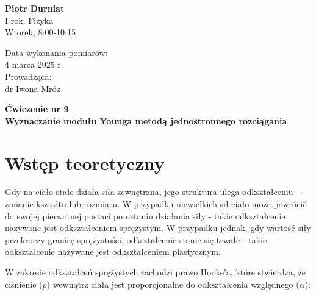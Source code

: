 \documentclass[a4paper,12pt]{article}
\begin{document}
\noindent
\begin{minipage}{0.5\textwidth}
    \raggedright
    \textbf{Piotr Durniat} \\
    I rok, Fizyka \\
    Wtorek, 8:00-10:15 \\
    \vspace{0.5cm}
    \vspace{0.5cm}
\end{minipage}%
\begin{minipage}{0.5\textwidth}
    \raggedleft
    Data wykonania pomiarów: \\
    4 marca 2025 r. \\
    \vspace{0.5cm} %
    Prowadząca: \\
    dr Iwona Mróz
\end{minipage}

\vspace{2cm} %
\begin{center}
    \LARGE \textbf{Ćwiczenie nr 9} \\[0.5cm]
    \Large \textbf{Wyznaczanie modułu Younga metodą jednostronnego rozciągania}
\end{center}

\vspace{1cm} %
\noindent


\section{Wstęp teoretyczny}


Gdy na ciało stałe działa siła zewnętrzna, jego struktura ulega odkształceniu - zmianie kształtu lub rozmiaru. W przypadku niewielkich sił ciało może powrócić do swojej pierwotnej postaci po ustaniu działania siły - takie odkształcenie nazywane jest odkształceniem sprężystym. W przypadku jednak, gdy wartość siły przekroczy granicę sprężystości, odkształcenie stanie się trwałe - takie odkształcenie nazywane jest odkształceniem plastycznym.


W zakresie odkształceń sprężystych zachodzi prawo Hooke'a, które stwierdza, że ciśnienie ($p$) wewnątrz ciała jest proporcjonalne do odkształcenia względnego ($\alpha$):
\end{document}

